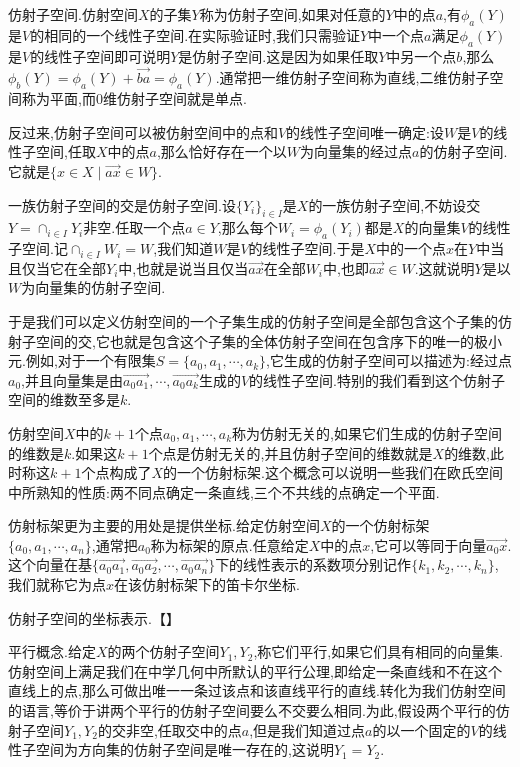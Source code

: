 仿射子空间.仿射空间$X$的子集$Y$称为仿射子空间,如果对任意的$Y$中的点$a$,有$\phi_a(Y)$是$V$的相同的一个线性子空间.在实际验证时,我们只需验证$Y$中一个点$a$满足$\phi_a(Y)$是$V$的线性子空间即可说明$Y$是仿射子空间.这是因为如果任取$Y$中另一个点$b$,那么$\phi_b(Y)=\phi_a(Y)+\overrightarrow{ba}=\phi_a(Y)$.通常把一维仿射子空间称为直线,二维仿射子空间称为平面,而0维仿射子空间就是单点.

反过来,仿射子空间可以被仿射空间中的点和$V$的线性子空间唯一确定:设$W$是$V$的线性子空间,任取$X$中的点$a$,那么恰好存在一个以$W$为向量集的经过点$a$的仿射子空间.它就是$\{x\in X\mid \overrightarrow{ax}\in W\}$.

一族仿射子空间的交是仿射子空间.设$\{Y_i\}_{i\in I}$是$X$的一族仿射子空间,不妨设交$Y=\cap_{i\in I}Y_i$非空.任取一个点$a\in Y$,那么每个$W_i=\phi_a(Y_i)$都是$X$的向量集$V$的线性子空间.记$\cap_{i\in I}W_i=W$,我们知道$W$是$V$的线性子空间.于是$X$中的一个点$x$在$Y$中当且仅当它在全部$Y_i$中,也就是说当且仅当$\overrightarrow{ax}$在全部$W_i$中,也即$\overrightarrow{ax}\in W$.这就说明$Y$是以$W$为向量集的仿射子空间.

于是我们可以定义仿射空间的一个子集生成的仿射子空间是全部包含这个子集的仿射子空间的交,它也就是包含这个子集的全体仿射子空间在包含序下的唯一的极小元.例如,对于一个有限集$S=\{a_0,a_1,\cdots,a_k\}$,它生成的仿射子空间可以描述为:经过点$a_0$,并且向量集是由$\overrightarrow{a_0a_1},\cdots,\overrightarrow{a_0a_k}$生成的$V$的线性子空间.特别的我们看到这个仿射子空间的维数至多是$k$.

仿射空间$X$中的$k+1$个点$a_0,a_1,\cdots,a_k$称为仿射无关的,如果它们生成的仿射子空间的维数是$k$.如果这$k+1$个点是仿射无关的,并且仿射子空间的维数就是$X$的维数,此时称这$k+1$个点构成了$X$的一个仿射标架.这个概念可以说明一些我们在欧氏空间中所熟知的性质:两不同点确定一条直线,三个不共线的点确定一个平面.

仿射标架更为主要的用处是提供坐标.给定仿射空间$X$的一个仿射标架$\{a_0,a_1,\cdots,a_n\}$,通常把$a_0$称为标架的原点.任意给定$X$中的点$x$,它可以等同于向量$\overrightarrow{a_0x}$.这个向量在基$\{\overrightarrow{a_0a_1},\overrightarrow{a_0a_2},\cdots,\overrightarrow{a_0a_n}\}$下的线性表示的系数项分别记作$\{k_1,k_2,\cdots,k_n\}$,我们就称它为点$x$在该仿射标架下的笛卡尔坐标.

仿射子空间的坐标表示.【】

平行概念.给定$X$的两个仿射子空间$Y_1,Y_2$,称它们平行,如果它们具有相同的向量集.仿射空间上满足我们在中学几何中所默认的平行公理,即给定一条直线和不在这个直线上的点,那么可做出唯一一条过该点和该直线平行的直线.转化为我们仿射空间的语言,等价于讲两个平行的仿射子空间要么不交要么相同.为此,假设两个平行的仿射子空间$Y_1,Y_2$的交非空,任取交中的点$a$,但是我们知道过点$a$的以一个固定的$V$的线性子空间为方向集的仿射子空间是唯一存在的,这说明$Y_1=Y_2$.

